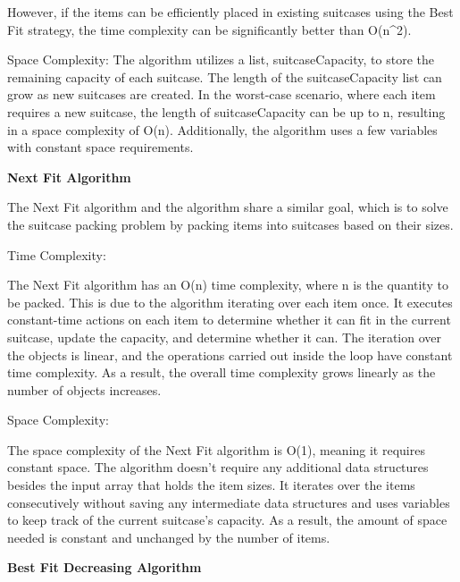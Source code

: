 \documentclass[12pt]{article}
\begin{document}
\noindent However, if the items can be efficiently placed in existing suitcases using the Best Fit strategy, the time complexity can be significantly better than O(n^2).

\vspace{0.5cm}
\noindent Space Complexity:
\noindent The algorithm utilizes a list, suitcaseCapacity, to store the remaining capacity of each suitcase. The length of the suitcaseCapacity list can grow as new suitcases are created. In the worst-case scenario, where each item requires a new suitcase, the length of suitcaseCapacity can be up to n, resulting in a space complexity of O(n). Additionally, the algorithm uses a few variables with constant space requirements.

\vspace{0.5cm}
\noindent \textbf{Next Fit Algorithm}
\vspace{0.1cm}

The Next Fit algorithm and the algorithm share a similar goal, which is to solve the suitcase packing problem by packing items into suitcases based on their sizes. 

\vspace{0.5cm}
\noindent Time Complexity:

\noindent The Next Fit algorithm has an O(n) time complexity, where n is the quantity to be packed. This is due to the algorithm iterating over each item once. It executes constant-time actions on each item to determine whether it can fit in the current suitcase, update the capacity, and determine whether it can. The iteration over the objects is linear, and the operations carried out inside the loop have constant time complexity. As a result, the overall time complexity grows linearly as the number of objects increases.

\vspace{0.5cm}
\noindent Space Complexity:

\noindent The space complexity of the Next Fit algorithm is O(1), meaning it requires constant space. The algorithm doesn't require any additional data structures besides the input array that holds the item sizes. It iterates over the items consecutively without saving any intermediate data structures and uses variables to keep track of the current suitcase's capacity. As a result, the amount of space needed is constant and unchanged by the number of items.

\vspace{0.5cm}


\vspace{0.5cm}
\noindent \textbf{Best Fit Decreasing Algorithm} 
\vspace{0.1cm}
\end{document}
